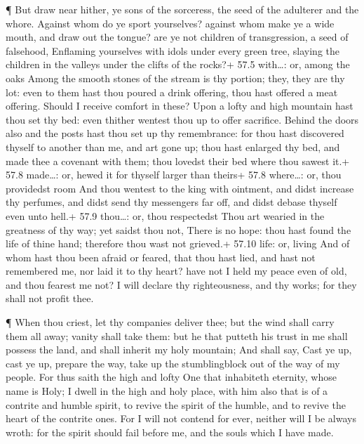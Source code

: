  ¶ But draw near hither, ye sons of the sorceress, the seed
of the adulterer and the whore.  Against whom do ye sport
yourselves? against whom make ye a wide mouth, and draw out the tongue?
are ye not children of transgression, a seed of falsehood, 
Enflaming yourselves with idols under every green tree, slaying the
children in the valleys under the clifts of the rocks?+ 57.5 with\ldots:
or, among the oaks  Among the smooth stones of the stream is
thy portion; they, they are thy lot: even to them hast thou poured a
drink offering, thou hast offered a meat offering. Should I receive
comfort in these?  Upon a lofty and high mountain hast thou
set thy bed: even thither wentest thou up to offer sacrifice.
 Behind the doors also and the posts hast thou set up thy
remembrance: for thou hast discovered thyself to another than me, and
art gone up; thou hast enlarged thy bed, and made thee a covenant with
them; thou lovedst their bed where thou sawest it.+ 57.8 made\ldots: or,
hewed it for thyself larger than theirs+ 57.8 where\ldots: or, thou
providedst room  And thou wentest to the king with ointment,
and didst increase thy perfumes, and didst send thy messengers far off,
and didst debase thyself even unto hell.+ 57.9 thou\ldots: or, thou
respectedst  Thou art wearied in the greatness of thy way;
yet saidst thou not, There is no hope: thou hast found the life of thine
hand; therefore thou wast not grieved.+ 57.10 life: or, living
 And of whom hast thou been afraid or feared, that thou
hast lied, and hast not remembered me, nor laid it to thy heart? have
not I held my peace even of old, and thou fearest me not? 
I will declare thy righteousness, and thy works; for they shall not
profit thee.

 ¶ When thou criest, let thy companies deliver thee; but
the wind shall carry them all away; vanity shall take them: but he that
putteth his trust in me shall possess the land, and shall inherit my
holy mountain;  And shall say, Cast ye up, cast ye up,
prepare the way, take up the stumblingblock out of the way of my people.
 For thus saith the high and lofty One that inhabiteth
eternity, whose name is Holy; I dwell in the high and holy place, with
him also that is of a contrite and humble spirit, to revive the spirit
of the humble, and to revive the heart of the contrite ones.
 For I will not contend for ever, neither will I be always
wroth: for the spirit should fail before me, and the souls which I have
made.

